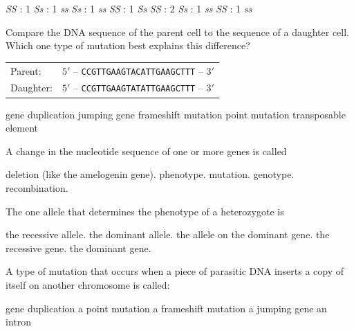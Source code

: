 \begin{choices}
 \textit{SS} : 1 \textit{Ss} : 1 \textit{ss}
 \textit{Ss} : 1 \textit{ss}
 \textit{SS} : 1 \textit{Ss}
 \textit{SS} : 2 \textit{Ss} : 1 \textit{ss}
 \textit{SS} : 1 \textit{ss}
\end{choices}

\question
Compare the DNA sequence of the parent cell to the sequence of a daughter cell.  Which one type of mutation best explains this difference?

\vspace{0.4\baselineskip}
\begin{tabular}{@{}ll@{}}
Parent: & $5'$ -- \texttt{CCGTTGAAGTACATTGAAGCTTT} -- $3'$\\
Daughter: & $5'$ -- \texttt{CCGTTGAAGTATATTGAAGCTTT} -- $3'$\\
\end{tabular}

\begin{choices}
\choice gene duplication
\choice jumping gene
\choice frameshift mutation
\correctchoice point mutation
\choice transposable element
\end{choices}

\newpage

\question
A change in the nucleotide sequence of one or more genes is called

\begin{choices}
\choice deletion (like the amelogenin gene).
\choice phenotype.
\correctchoice mutation.
\choice genotype.
\choice recombination.
\end{choices}

\question
The one allele that determines the phenotype of a heterozygote is

\begin{choices}
\choice the recessive allele.
\correctchoice the dominant allele.
\choice the allele on the dominant gene.
\choice the recessive gene.
\choice the dominant gene.
\end{choices}

\question
A type of mutation that occurs when a piece of parasitic DNA inserts a copy of itself on another chromosome is called:

\begin{choices}
\choice gene duplication
\choice a point mutation
\choice a frameshift mutation
\correctchoice a jumping gene
\choice an intron
\end{choices}

